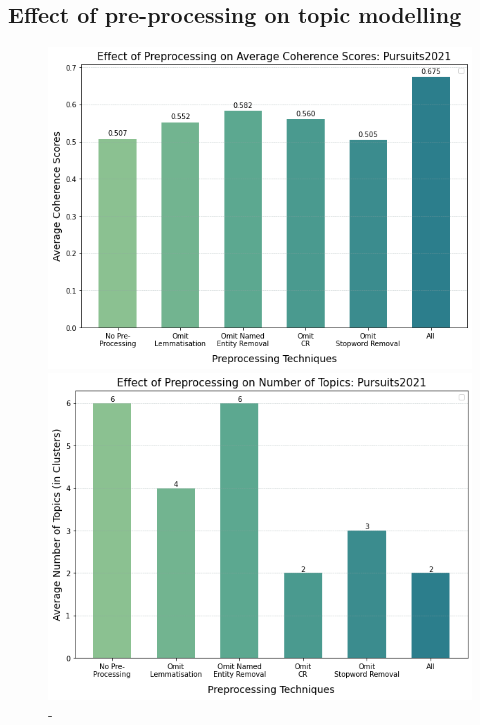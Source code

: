 \subsection{Effect of pre-processing on topic modelling} \label{s:preprocess_topic}

\begin{figure}[H]
  \centering
    \begin{minipage}[t]{.49\linewidth}
      \centering
      \includegraphics[width=\linewidth]{images/eval/coherence_preprocess.png}
      \caption{-}
      \label{fig:preprocess_topic}
    \end{minipage}
    \begin{minipage}[t]{.49\textwidth}
      \centering
      \includegraphics[width=\linewidth]{images/eval/preprocessingTopicNo.png}
      \caption{-}
       \label{fig:pre-processing_topic_no}
    \end{minipage}
  \end{figure}

